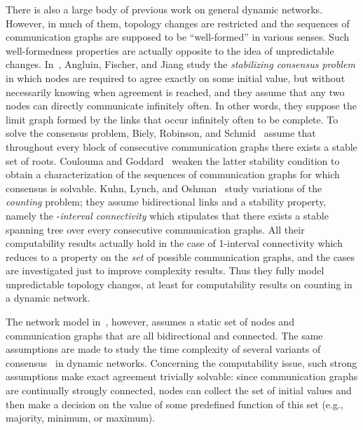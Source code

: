 \documentclass[a4paper]{article}
\theoremstyle{newthm}
\begin{document}
There is also a large body of previous work  on general dynamic networks.
However, in much of them, topology changes are restricted and the sequences of
	communication graphs are supposed to be ``well-formed'' in  various senses.
Such well-formedness properties are actually opposite to the idea of
	unpredictable changes.
In~\cite{AFJ06}, Angluin, Fischer, and Jiang study the {\em stabilizing consensus problem}
	in which nodes are required to agree exactly on some initial value, but without necessarily 
	knowing  when agreement is reached, and they
	assume  that any two nodes can directly communicate infinitely often.
In other words, they suppose the limit graph formed by the links that occur infinitely often to be complete.
To solve the consensus problem, Biely, Robinson, and Schmid~\cite{BRS12} assume that 
	throughout every block of  consecutive communication graphs there exists 
	a stable set of roots.
Coulouma and Goddard~\cite{CG13} weaken the latter stability condition to obtain a characterization
	of the sequences of communication  graphs for which consensus is solvable.
Kuhn, Lynch, and Oshman~\cite{KLO10} study  variations of the {\em counting}  problem; they  
	assume bidirectional links and a stability property, namely the -{\em interval
	connectivity} which stipulates that there exists a stable spanning tree over every  consecutive 
	communication graphs.
All their computability results actually hold in the case of 1-interval connectivity which reduces to
	a property on the {\em set} of possible communication graphs, and the cases  are 
	investigated just to improve complexity results.
Thus they  fully model unpredictable topology changes, at least for computability results
	on counting in a dynamic network.
	
The network model in~\cite{KLO10}, however, assumes a static set of nodes and communication graphs 
	that are all bidirectional  and connected.
The same  assumptions are made to study the time complexity of several variants of consensus~\cite{KMO11}
	in dynamic networks.
Concerning the computability issue,  such strong assumptions make exact agreement trivially solvable: 
	since communication graphs are continually strongly connected, nodes can collect the set of initial values
	and then make a decision on the value of some predefined function of this set
	(e.g., majority, minimum, or maximum).	
\end{document}
